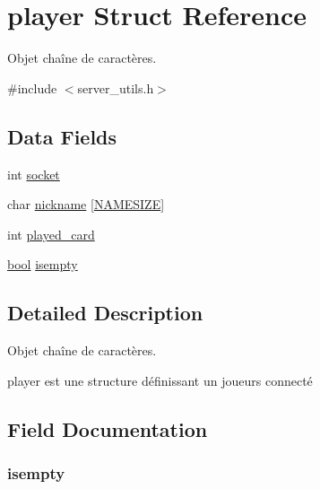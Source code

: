 \hypertarget{structplayer}{}\section{player Struct Reference}
\label{structplayer}


Objet chaîne de caractères.  




{\ttfamily \#include $<$server\+\_\+utils.\+h$>$}

\subsection*{Data Fields}
\begin{DoxyCompactItemize}
\item 
int \hyperlink{structplayer_a3666576f6b88007cc7b8f26c7da596c8}{socket}
\item 
char \hyperlink{structplayer_abc1303214a95d3587252a9bdec717b62}{nickname} \mbox{[}\hyperlink{config_8h_ad79aefee6a8990632311a15e98d9a65f}{N\+A\+M\+E\+S\+I\+ZE}\mbox{]}
\item 
int \hyperlink{structplayer_a930188281b101d95d5d8d4c7f25e9467}{played\+\_\+card}
\item 
\hyperlink{config_8h_a1062901a7428fdd9c7f180f5e01ea056}{bool} \hyperlink{structplayer_af73673cff30ba393d027d29a71ffad13}{isempty}
\end{DoxyCompactItemize}


\subsection{Detailed Description}
Objet chaîne de caractères. 

player est une structure définissant un joueurs connecté 

\subsection{Field Documentation}
\subsubsection[{\texorpdfstring{isempty}{isempty}}]{ isempty}\hypertarget{structplayer_af73673cff30ba393d027d29a71ffad13}{}\label{structplayer_af73673cff30ba393d027d29a71ffad13}
